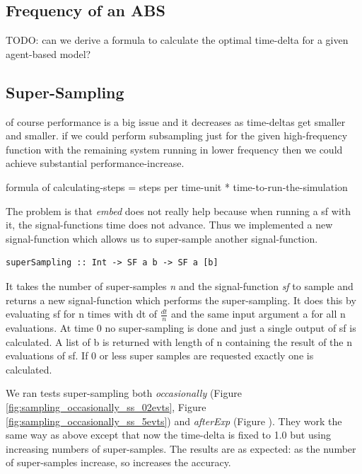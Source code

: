 \subsection{Frequency of an ABS}
TODO: can we derive a formula to calculate the optimal time-delta for a given agent-based model?

\subsection{Super-Sampling}
of course performance is a big issue and it decreases as time-deltas get smaller and smaller. if we could perform subsampling just for the given high-frequency function with the remaining system running in lower frequency then we could achieve substantial performance-increase.

formula of calculating-steps = steps per time-unit * time-to-run-the-simulation

The problem is that \textit{embed} does not really help because when running a sf with it, the signal-functions time does not advance. Thus we implemented a new signal-function which allows us to super-sample another signal-function.

\begin{verbatim}
superSampling :: Int -> SF a b -> SF a [b]
\end{verbatim}

It takes the number of super-samples \textit{n} and the signal-function \textit{sf} to sample and returns a new signal-function which performs the super-sampling. It does this by evaluating sf for n times with dt of $\frac{dt}{n}$ and the same input argument a for all n evaluations. At time 0 no super-sampling is done and just a single output of sf is calculated. A list of b is returned with length of n containing the result of the n evaluations of sf. If 0 or less super samples are requested exactly one is calculated.

We ran tests super-sampling both \textit{occasionally} (Figure \ref{fig:sampling_occasionally_ss_02evts}, Figure \ref{fig:sampling_occasionally_ss_5evts}) and \textit{afterExp} (Figure ). They work the same way as above except that now the time-delta is fixed to 1.0 but using increasing numbers of super-samples. The results are as expected: as the number of super-samples increase, so increases the accuracy.

